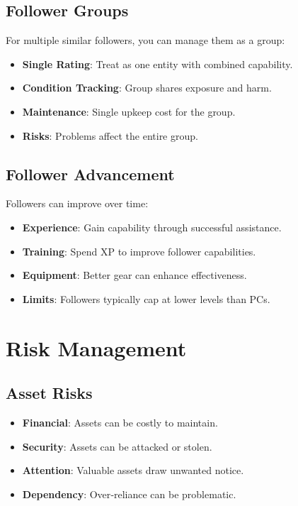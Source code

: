 \subsection*{Follower Groups}
\label{sec:follower-groups}
For multiple similar followers, you can manage them as a group:
\begin{itemize}
\item \textbf{Single Rating}: Treat as one entity with combined capability.
\item \textbf{Condition Tracking}: Group shares exposure and harm.
\item \textbf{Maintenance}: Single upkeep cost for the group.
\item \textbf{Risks}: Problems affect the entire group.
\end{itemize}

\subsection*{Follower Advancement}
\label{sec:follower-advancement}
Followers can improve over time:
\begin{itemize}
\item \textbf{Experience}: Gain capability through successful assistance.
\item \textbf{Training}: Spend XP to improve follower capabilities.
\item \textbf{Equipment}: Better gear can enhance effectiveness.
\item \textbf{Limits}: Followers typically cap at lower levels than PCs.
\end{itemize}

\section{Risk Management}
\label{sec:asset-follower-risk}

\subsection*{Asset Risks}
\label{sec:asset-risks}
\begin{itemize}
\item \textbf{Financial}: Assets can be costly to maintain.
\item \textbf{Security}: Assets can be attacked or stolen.
\item \textbf{Attention}: Valuable assets draw unwanted notice.
\item \textbf{Dependency}: Over‑reliance can be problematic.
\end{itemize}

